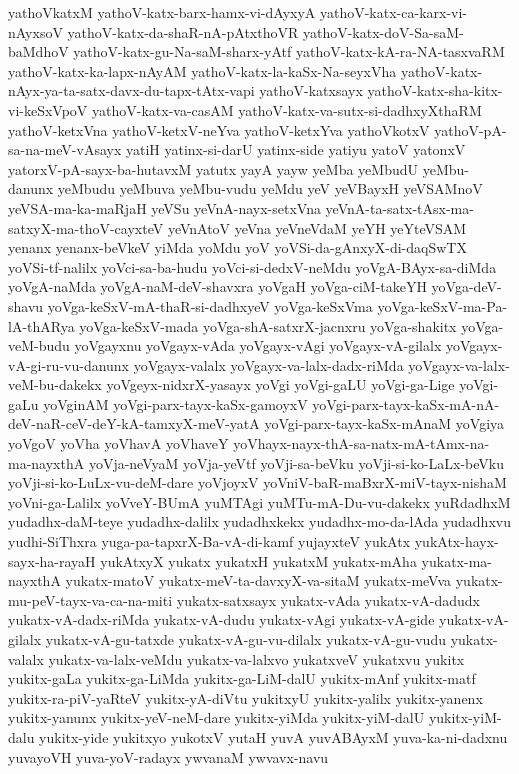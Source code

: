 {yathoVkatxM
yathoV-katx-barx-hamx-vi-dAyxyA
yathoV-katx-ca-karx-vi-nAyxsoV
yathoV-katx-da-shaR-nA-pAtxthoVR
yathoV-katx-doV-Sa-saM-baMdhoV
yathoV-katx-gu-Na-saM-sharx-yAtf
yathoV-katx-kA-ra-NA-tasxvaRM
yathoV-katx-ka-lapx-nAyAM
yathoV-katx-la-kaSx-Na-seyxVha
yathoV-katx-nAyx-ya-ta-satx-davx-du-tapx-tAtx-vapi
yathoV-katxsayx
yathoV-katx-sha-kitx-vi-keSxVpoV
yathoV-katx-va-casAM
yathoV-katx-va-sutx-si-dadhxyXthaRM
yathoV-ketxVna
yathoV-ketxV-neYva
yathoV-ketxYva
yathoVkotxV
yathoV-pA-sa-na-meV-vAsayx
yatiH
yatinx-si-darU
yatinx-side
yatiyu
yatoV
yatonxV
yatorxV-pA-sayx-ba-hutavxM
yatutx
yayA
yayw
yeMba
yeMbudU
yeMbu-danunx
yeMbudu
yeMbuva
yeMbu-vudu
yeMdu
yeV
yeVBayxH
yeVSAMnoV
yeVSA-ma-ka-maRjaH
yeVSu
yeVnA-nayx-setxVna
yeVnA-ta-satx-tAsx-ma-satxyX-ma-thoV-cayxteV
yeVnAtoV
yeVna
yeVneVdaM
yeYH
yeYteVSAM
yenanx
yenanx-beVkeV
yiMda
yoMdu
yoV
yoVSi-da-gAnxyX-di-daqSwTX
yoVSi-tf-nalilx
yoVci-sa-ba-hudu
yoVci-si-dedxV-neMdu
yoVgA-BAyx-sa-diMda
yoVgA-naMda
yoVgA-naM-deV-shavxra
yoVgaH
yoVga-ciM-takeYH
yoVga-deV-shavu
yoVga-keSxV-mA-thaR-si-dadhxyeV
yoVga-keSxVma
yoVga-keSxV-ma-Pa-lA-thARya
yoVga-keSxV-mada
yoVga-shA-satxrX-jacnxru
yoVga-shakitx
yoVga-veM-budu
yoVgayxnu
yoVgayx-vAda
yoVgayx-vAgi
yoVgayx-vA-gilalx
yoVgayx-vA-gi-ru-vu-danunx
yoVgayx-valalx
yoVgayx-va-lalx-dadx-riMda
yoVgayx-va-lalx-veM-bu-dakekx
yoVgeyx-nidxrX-yasayx
yoVgi
yoVgi-gaLU
yoVgi-ga-Lige
yoVgi-gaLu
yoVginAM
yoVgi-parx-tayx-kaSx-gamoyxV
yoVgi-parx-tayx-kaSx-mA-nA-deV-naR-ceV-deY-kA-tamxyX-meV-yatA
yoVgi-parx-tayx-kaSx-mAnaM
yoVgiya
yoVgoV
yoVha
yoVhavA
yoVhaveY
yoVhayx-nayx-thA-sa-natx-mA-tAmx-na-ma-nayxthA
yoVja-neVyaM
yoVja-yeVtf
yoVji-sa-beVku
yoVji-si-ko-LaLx-beVku
yoVji-si-ko-LuLx-vu-deM-dare
yoVjoyxV
yoVniV-baR-maBxrX-miV-tayx-nishaM
yoVni-ga-Lalilx
yoVveY-BUmA
yuMTAgi
yuMTu-mA-Du-vu-dakekx
yuRdadhxM
yudadhx-daM-teye
yudadhx-dalilx
yudadhxkekx
yudadhx-mo-da-lAda
yudadhxvu
yudhi-SiThxra
yuga-pa-tapxrX-Ba-vA-di-kamf
yujayxteV
yukAtx
yukAtx-hayx-sayx-ha-rayaH
yukAtxyX
yukatx
yukatxH
yukatxM
yukatx-mAha
yukatx-ma-nayxthA
yukatx-matoV
yukatx-meV-ta-davxyX-va-sitaM
yukatx-meVva
yukatx-mu-peV-tayx-va-ca-na-miti
yukatx-satxsayx
yukatx-vAda
yukatx-vA-dadudx
yukatx-vA-dadx-riMda
yukatx-vA-dudu
yukatx-vAgi
yukatx-vA-gide
yukatx-vA-gilalx
yukatx-vA-gu-tatxde
yukatx-vA-gu-vu-dilalx
yukatx-vA-gu-vudu
yukatx-valalx
yukatx-va-lalx-veMdu
yukatx-va-lalxvo
yukatxveV
yukatxvu
yukitx
yukitx-gaLa
yukitx-ga-LiMda
yukitx-ga-LiM-dalU
yukitx-mAnf
yukitx-matf
yukitx-ra-piV-yaRteV
yukitx-yA-diVtu
yukitxyU
yukitx-yalilx
yukitx-yanenx
yukitx-yanunx
yukitx-yeV-neM-dare
yukitx-yiMda
yukitx-yiM-dalU
yukitx-yiM-dalu
yukitx-yide
yukitxyo
yukotxV
yutaH
yuvA
yuvABAyxM
yuva-ka-ni-dadxnu
yuvayoVH
yuva-yoV-radayx
ywvanaM
ywvavx-navu
}
